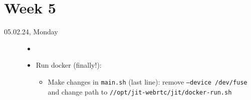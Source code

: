 \documentclass[a4, 11pt]{scrartcl}
\begin{document}
\newpage
\section*{Week 5}

\begin{description}

\item[05.02.24, Monday]
\begin{itemize}
	\item[]
	\item Run docker (finally!): 
	\begin{itemize}
		\item Make changes in \texttt{main.sh} (last line): remove \texttt{--device /dev/fuse} and change path to  \texttt{//opt/jit-webrtc/jit/docker-run.sh}
	\end{itemize}
\end{itemize}









		
		
	\end{description}
	
	
	
	
	
	
\end{document}
